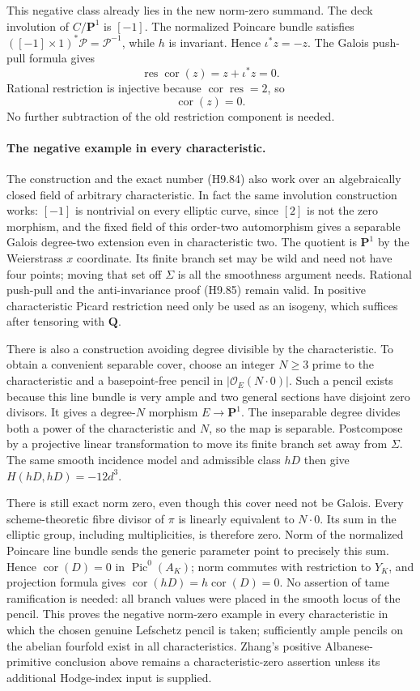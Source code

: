 This negative class already lies in the new norm-zero summand.
The deck involution of $C/\mathbf P^1$ is $[-1]$.
The normalized Poincare bundle satisfies
$([-1]\times1)^*\mathcal P=\mathcal P^{-1}$, while $h$ is
invariant. Hence $\iota^*z=-z$. The Galois push-pull formula gives
\[
 \operatorname{res}\operatorname{cor}(z)=z+\iota^*z=0.
\]
Rational restriction is injective because
$\operatorname{cor}\operatorname{res}=2$, so
\[
                         \operatorname{cor}(z)=0.            \tag{H9.85}
\]
No further subtraction of the old restriction component is needed.

\paragraph{The negative example in every characteristic.}
The construction and the exact number (H9.84) also work over an
algebraically closed field of arbitrary characteristic. In fact the
same involution construction works: $[-1]$ is nontrivial on every
elliptic curve, since $[2]$ is not the zero morphism, and the fixed
field of this order-two automorphism gives a separable Galois
degree-two extension even in characteristic two. The quotient is
$\mathbf P^1$ by the Weierstrass $x$ coordinate. Its finite branch
set may be wild and need not have four points; moving that set
off $\Sigma$ is all the smoothness argument needs. Rational
push-pull and the anti-invariance proof (H9.85) remain valid.
In positive characteristic Picard restriction need only be used as
an isogeny, which suffices after tensoring with $\mathbf Q$.

There is also a construction avoiding degree divisible by the
characteristic. To obtain
a convenient separable cover, choose an integer $N\ge3$ prime to
the characteristic and a basepoint-free pencil in
$|\mathcal O_E(N\cdot0)|$. Such a pencil exists because this line
bundle is very ample and two general sections have disjoint zero
divisors. It gives a degree-$N$ morphism $E\to\mathbf P^1$.
The inseparable degree divides both a power of the characteristic
and $N$, so the map is separable. Postcompose by a projective
linear transformation to move its finite branch set away from
$\Sigma$. The same smooth incidence model and admissible class
$hD$ then give $H(hD,hD)=-12d^3$.

There is still exact norm zero, even though this cover need not be
Galois. Every scheme-theoretic fibre divisor of $\pi$ is linearly
equivalent to $N\cdot0$. Its sum in the elliptic group, including
multiplicities, is therefore zero. Norm of the normalized Poincare
line bundle sends the generic parameter point to precisely this
sum. Hence $\operatorname{cor}(D)=0$ in
$\operatorname{Pic}^0(A_K)$; norm commutes with restriction to
$Y_K$, and projection formula gives
$\operatorname{cor}(hD)=h\operatorname{cor}(D)=0$.
No assertion of tame ramification is needed: all branch values
were placed in the smooth locus of the pencil. This proves the
negative norm-zero example in every characteristic in which the
chosen genuine Lefschetz pencil is taken; sufficiently ample
pencils on the abelian fourfold exist in all characteristics.
Zhang's positive Albanese-primitive conclusion above remains a
characteristic-zero assertion unless its additional Hodge-index
input is supplied.

